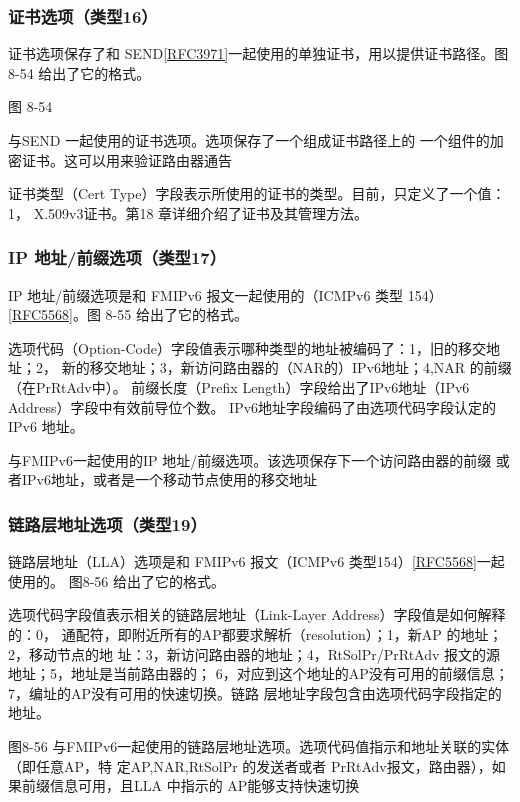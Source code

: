 \subsubsection{证书选项（类型16）}
证书选项保存了和
SEND\href{https://www.rfc-editor.org/rfc/rfc3971}{[RFC3971]}一起使用的单独证书，用以提供证书路径。图8-54
给出了它的格式。

图 8-54

与SEND 一起使用的证书选项。选项保存了一个组成证书路径上的
一个组件的加密证书。这可以用来验证路由器通告

证书类型（Cert Type）字段表示所使用的证书的类型。目前，只定义了一个值：1，
X.509v3证书。第18 章详细介绍了证书及其管理方法。

\subsubsection{IP 地址/前缀选项（类型17）}
IP 地址/前缀选项是和 FMIPv6 报文一起使用的（ICMPv6 类型
154）\href{https://www.rfc-editor.org/rfc/rfc5568}{[RFC5568]}。图
8-55 给出了它的格式。

选项代码（Option-Code）字段值表示哪种类型的地址被编码了：1，旧的移交地址；2，
新的移交地址；3，新访问路由器的（NAR的）IPv6地址；4,NAR 的前缀（在PrRtAdv中）。
前缀长度（Prefix Length）字段给出了IPv6地址（IPv6 Address）字段中有效前导位个数。
IPv6地址字段编码了由选项代码字段认定的 IPv6 地址。

与FMIPv6一起使用的IP 地址/前缀选项。该选项保存下一个访问路由器的前缀
或者IPv6地址，或者是一个移动节点使用的移交地址

\subsubsection{链路层地址选项（类型19）}
链路层地址（LLA）选项是和 FMIPv6 报文（ICMPv6
类型154）\href{https://www.rfc-editor.org/rfc/rfc5568}{[RFC5568]}一起使用的。
图8-56 给出了它的格式。

选项代码字段值表示相关的链路层地址（Link-Layer Address）字段值是如何解释的：0，
通配符，即附近所有的AP都要求解析（resolution）；1，新AP 的地址；2，移动节点的地
址：3，新访问路由器的地址；4，RtSolPr/PrRtAdv 报文的源地址；5，地址是当前路由器的；
6，对应到这个地址的AP没有可用的前缀信息；7，编址的AP没有可用的快速切换。链路
层地址字段包含由选项代码字段指定的地址。

图8-56 与FMIPv6一起使用的链路层地址选项。选项代码值指示和地址关联的实体（即任意AP，特
定AP,NAR,RtSolPr 的发送者或者 PrRtAdv报文，路由器），如果前缀信息可用，且LLA
中指示的 AP能够支持快速切换

